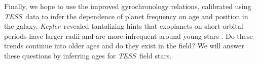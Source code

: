 \documentclass[useAMS, usenatbib, preprint, 12pt]{aastex}
\newcommand{\Kepler}{{\it Kepler}}
\newcommand{\kepler}{\Kepler}
\newcommand{\TESS}{{\it TESS}}
\begin{document}
Finally, we hope to use the improved gyrochronology relations, calibrated
using \TESS\ data to infer the dependence of planet frequency on age and
position in the galaxy.
\kepler\ revealed tantalizing hints that exoplanets on short orbital periods
have larger radii and are more infrequent around young stars \citep{mann2016a,
mann2016b, rizzuto2017}.
Do these trends continue into older ages and do they exist in the field?
We will answer these questions by inferring ages for \TESS\ field stars.



\end{document}
